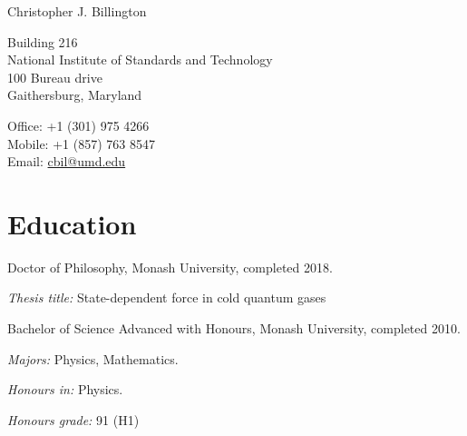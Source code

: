 \documentclass[10pt,a4paper]{article}
\def\name{Christopher J. Billington}
\renewenvironment{itemize}{
  \begin{list}{}{
    \setlength{\leftmargin}{1.5em}
    \setlength{\itemsep}{0.25em}
    \setlength{\parskip}{0pt}
    \setlength{\parsep}{0.25em}
  }
}{
  \end{list}
}
\begin{document}
{\huge \name}

\bigskip

\begin{minipage}[t]{0.5\textwidth}
  Building 216 \\
  National Institute of Standards and Technology \\
  100 Bureau drive \\
  Gaithersburg, Maryland
\end{minipage}
\begin{minipage}[t]{0.5\textwidth}
  Office: +1 (301) 975 4266 \\
  Mobile: +1 (857) 763 8547 \\
  Email: \href{mailto:cbil@umd.edu}{cbil@umd.edu} \\
\end{minipage}

\section*{Education}

\begin{itemize}

  \item Doctor of Philosophy, Monash University, completed 2018.
    \begin{itemize}
    \item \textit{Thesis title:}
      State-dependent force in cold quantum gases
    \end{itemize}
    
  \item Bachelor of Science Advanced with Honours, Monash University, completed 2010.
    \begin{itemize}
    \item \textit{Majors:}
      Physics, Mathematics.
    \item \textit{Honours in:}
      Physics.
    \item \textit{Honours grade:} 91 (\textsc{H}1)
    \end{itemize}
    
  
\end{itemize}
\end{document}
